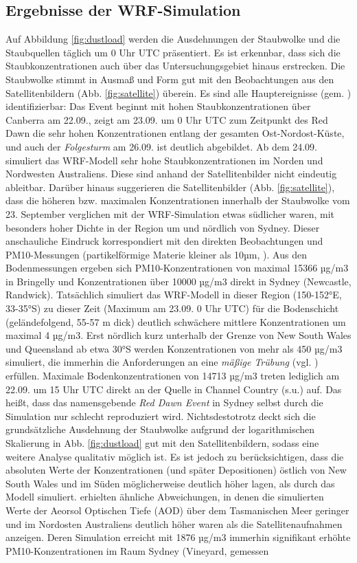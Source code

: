 \documentclass[12pt,a4paper,onecolumn]{scrartcl}
\begin{document}
\subsection{Ergebnisse der WRF-Simulation} \label{sec:wrf_results}
Auf Abbildung \ref{fig:dustload} werden die Ausdehnungen der Staubwolke und die Staubquellen täglich um 0 Uhr UTC präsentiert. Es ist erkennbar, dass sich die Staubkonzentrationen auch über das Untersuchungsgebiet hinaus erstrecken. Die Staubwolke stimmt in Ausmaß und Form gut mit den Beobachtungen aus den Satellitenbildern (Abb. \ref{fig:satellite}) überein. Es sind alle Hauptereignisse (gem. \cite{Leys.2009}) identifizierbar: Das Event beginnt mit hohen Staubkonzentrationen über Canberra am 22.09., zeigt am 23.09. um 0 Uhr UTC zum Zeitpunkt des Red Dawn die sehr hohen Konzentrationen entlang der gesamten Ost-Nordost-Küste, und auch der \textit{Folgesturm} am 26.09. ist deutlich abgebildet. Ab dem 24.09. simuliert das WRF-Modell sehr hohe Staubkonzentrationen im Norden und Nordwesten Australiens. Diese sind anhand der Satellitenbilder nicht eindeutig ableitbar. Darüber hinaus suggerieren die Satellitenbilder (Abb. \ref{fig:satellite}), dass die höheren bzw. maximalen Konzentrationen innerhalb der Staubwolke vom 23. September verglichen mit der WRF-Simulation etwas südlicher waren, mit besonders hoher Dichte in der Region um und nördlich von Sydney. Dieser anschauliche Eindruck korrespondiert mit den direkten Beobachtungen und PM10-Messungen (partikelförmige Materie kleiner als 10µm, \cite{Leys.2011}). Aus den Bodenmessungen ergeben sich PM10-Konzentrationen von maximal 15366 µg/m3 in Bringelly und Konzentrationen über 10000 µg/m3 direkt in Sydney (Newcastle, Randwick). Tatsächlich simuliert das WRF-Modell in dieser Region (150-152°E, 33-35°S) zu dieser Zeit (Maximum am 23.09. 0 Uhr UTC) für die Bodenschicht (geländefolgend, 55-57 m dick) deutlich schwächere mittlere Konzentrationen um maximal 4 µg/m3. Erst nördlich kurz unterhalb der Grenze von New South Wales und Queensland ab etwa 30°S werden Konzentrationen von mehr als 450 µg/m3 simuliert, die immerhin die Anforderungen an eine \textit{mäßige Trübung} (vgl. \cite{Leys.2011}) erfüllen. Maximale Bodenkonzentrationen von 14713 µg/m3 treten lediglich am 22.09. um 15 Uhr UTC direkt an der Quelle in Channel Country (s.u.) auf. Das heißt, dass das namensgebende \textit{Red Dawn Event} in Sydney selbst durch die Simulation nur schlecht reproduziert wird. Nichtsdestotrotz deckt sich die grundsätzliche Ausdehnung der Staubwolke aufgrund der logarithmischen Skalierung in Abb. \ref{fig:dustload} gut mit den Satellitenbildern, sodass eine weitere Analyse qualitativ möglich ist. Es ist jedoch zu berücksichtigen, dass die absoluten Werte der Konzentrationen (und später Depositionen) östlich von New South Wales und im Süden möglicherweise deutlich höher lagen, als durch das Modell simuliert. \citet{AlizadehChoobari.2012} erhielten ähnliche Abweichungen, in denen die simulierten Werte der Aeorsol Optischen Tiefe (AOD) über dem Tasmanischen Meer geringer und im Nordosten Australiens deutlich höher waren als die Satellitenaufnahmen anzeigen. Deren Simulation erreicht mit 1876 µg/m3 immerhin signifikant erhöhte PM10-Konzentrationen im Raum Sydney (Vineyard, gemessen 
\end{document}
